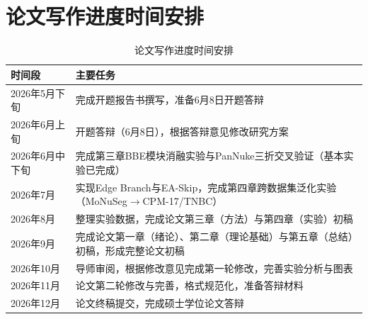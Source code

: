 \documentclass{sufethesismas}
\begin{document}
\chapter{论文写作进度时间安排}

\begin{table}[H]
  \centering
  \caption{论文写作进度时间安排}
  \label{tab:schedule}
  \small
  \begin{tabularx}{\textwidth}{lX}
    \toprule
    \textbf{时间段} & \textbf{主要任务} \\
    \midrule
    2026年5月下旬 & 完成开题报告书撰写，准备6月8日开题答辩 \\
    2026年6月上旬 & 开题答辩（6月8日），根据答辩意见修改研究方案 \\
    2026年6月中下旬 & 完成第三章BBE模块消融实验与PanNuke三折交叉验证（基本实验已完成） \\
    2026年7月 & 实现Edge Branch与EA-Skip，完成第四章跨数据集泛化实验（MoNuSeg$\rightarrow$CPM-17/TNBC） \\
    2026年8月 & 整理实验数据，完成论文第三章（方法）与第四章（实验）初稿 \\
    2026年9月 & 完成论文第一章（绪论）、第二章（理论基础）与第五章（总结）初稿，形成完整论文初稿 \\
    2026年10月 & 导师审阅，根据修改意见完成第一轮修改，完善实验分析与图表 \\
    2026年11月 & 论文第二轮修改与完善，格式规范化，准备答辩材料 \\
    2026年12月 & 论文终稿提交，完成硕士学位论文答辩 \\
    \bottomrule
  \end{tabularx}
\end{table}



\end{document}
